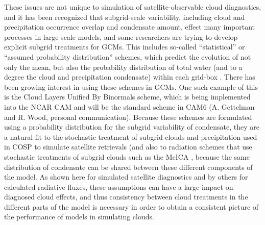 These issues are not unique to simulation of satellite-observable cloud
diagnostics, and it has been recognized that subgrid-scale variability,
including cloud and precipitation occurrence overlap and condensate
amount, effect many important processes in large-scale models, and some
researchers are trying to develop explicit subgrid treatments for GCMs.
This includes so-called ``statistical'' or ``assumed probability
distribution'' schemes, which predict the evolution of not only the
mean, but also the probability distribution of total water (and to a
degree the cloud and precipitation condensate) within each grid-box
\citep[e.g.,][]{tompkins_2002}. There has been growing interest in using
these schemes in GCMs. One such example of this is the Cloud Layers
Unified By Binormals \citep[CLUBB;][]{golaz_et_al_2002} scheme, which is
being implemented into the NCAR CAM and will be the standard scheme in
CAM6 (A. Gettelman and R. Wood, personal communication). Because these
schemes are formulated using a probability distribution for the subgrid
variability of condensate, they are a natural fit to the stochastic
treatment of subgrid clouds and precipitation used in COSP to simulate
satellite retrievals (and also to radiation schemes that use stochastic
treatments of subgrid clouds such as the McICA
\citep{pincus_et_al_2003}, because the same distribution of condensate
can be shared between these different components of the model. As shown
here for simulated satellite diagnostics and by others for calculated
radiative fluxes, these assumptions can have a large impact on diagnosed
cloud effects, and thus consistency between cloud treatments in the
different parts of the model is necessary in order to obtain a
consistent picture of the performance of models in simulating clouds.
